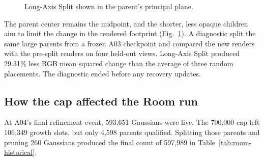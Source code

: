 \documentclass[11pt,a4paper]{article}
\begin{document}
\begin{figure}[!ht]
\centering
{}
\caption{Long-Axis Split shown in the parent's principal plane.}
\label{fig:long-axis}
\end{figure}

The parent center remains the midpoint, and the shorter, less opaque
children aim to limit the change in the rendered footprint
(Fig.~\ref{fig:long-axis}). A diagnostic split the same large parents from
a frozen A03 checkpoint and compared the new renders with the pre-split
renders on four held-out views. Long-Axis Split produced 29.31\% less RGB
mean squared change than the average of three random placements. The
diagnostic ended before any recovery updates.

\subsection{How the cap affected the Room run}
At A04's final refinement event, 593,651 Gaussians were live. The 700,000
cap left 106,349 growth slots, but only 4,598 parents qualified. Splitting
those parents and pruning 260 Gaussians produced the final count of
597,989 in Table~\ref{tab:room-historical}.
\end{document}
